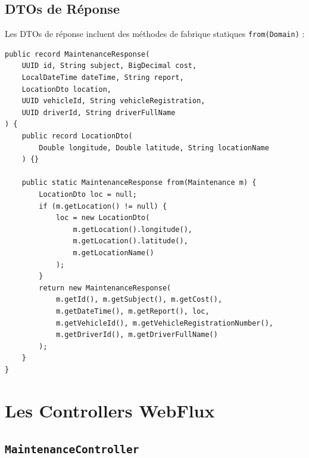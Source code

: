 \documentclass[12pt,a4paper]{report}
\begin{document}
\subsection{DTOs de Réponse}

Les DTOs de réponse incluent des méthodes de fabrique statiques \texttt{from(Domain)} :

\begin{lstlisting}[style=javaStyle, caption={DTO de réponse MaintenanceResponse avec fabrique}]
public record MaintenanceResponse(
    UUID id, String subject, BigDecimal cost,
    LocalDateTime dateTime, String report,
    LocationDto location,
    UUID vehicleId, String vehicleRegistration,
    UUID driverId, String driverFullName
) {
    public record LocationDto(
        Double longitude, Double latitude, String locationName
    ) {}

    public static MaintenanceResponse from(Maintenance m) {
        LocationDto loc = null;
        if (m.getLocation() != null) {
            loc = new LocationDto(
                m.getLocation().longitude(),
                m.getLocation().latitude(),
                m.getLocationName()
            );
        }
        return new MaintenanceResponse(
            m.getId(), m.getSubject(), m.getCost(),
            m.getDateTime(), m.getReport(), loc,
            m.getVehicleId(), m.getVehicleRegistrationNumber(),
            m.getDriverId(), m.getDriverFullName()
        );
    }
}
\end{lstlisting}

\section{Les Controllers WebFlux}

\subsection{\texttt{MaintenanceController}}
\end{document}
